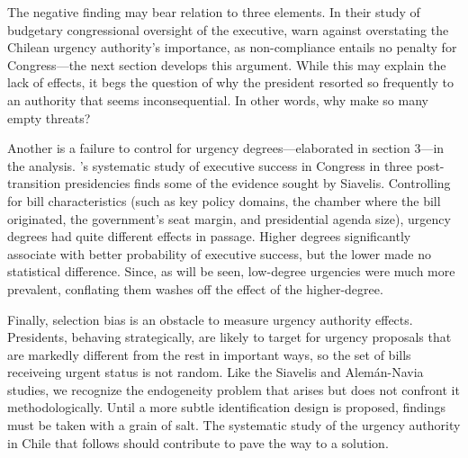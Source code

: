 \documentclass[letter,12pt]{article}
\begin{document}
The negative finding may bear relation to three elements. In their study of budgetary congressional oversight of the executive, \citet{berrios.gamboa.fiscChile.2006} warn against overstating the Chilean urgency authority's importance, as non-compliance entails no penalty for Congress---the next section develops this argument. While this may explain the lack of effects, it begs the question of why the president resorted so frequently to an authority that seems inconsequential. In other words, why make so many empty threats?

Another is a failure to control for urgency degrees---elaborated in section 3---in the analysis. \citeauthor{aleman.navia.UrgChi.2009}'s \citeyearpar{aleman.navia.UrgChi.2009} systematic study of executive success in Congress in three post-transition presidencies finds some of the evidence sought by Siavelis. Controlling for bill characteristics (such as key policy domains, the chamber where the bill originated, the government's seat margin, and presidential agenda size), urgency degrees had quite different effects in passage. Higher degrees significantly associate with better probability of executive success, but the lower made no statistical difference. Since, as will be seen, low-degree urgencies were much more prevalent, conflating them washes off the effect of the higher-degree. 


Finally, selection bias is an obstacle to measure urgency authority effects. Presidents, behaving strategically, are likely to target for urgency proposals that are markedly different from the rest in important ways, so the set of bills receiveing urgent status is not random. Like the Siavelis and Alem\'an-Navia studies, we recognize the endogeneity problem that arises but does not confront it methodologically. Until a more subtle identification design is proposed, findings must be taken with a grain of salt. The systematic study of the urgency authority in Chile that follows should contribute to pave the way to a solution. 
\end{document}
